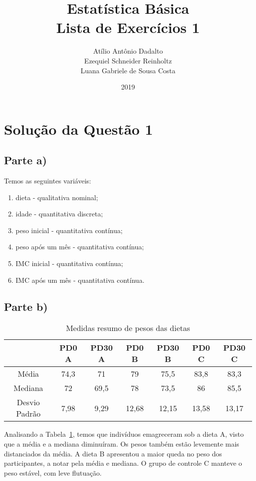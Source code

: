 \documentclass[
	12pt,				%
	openright,			%
	twoside,			%
	a4paper,			%
	english,			%
	french,				%
	spanish,			%
	brazil,				%
	]{abntex2}
\title{\blue Estatística Básica \\
\blueb Lista de Exercícios 1}
\author{Atílio Antônio Dadalto\\Ezequiel Schneider Reinholtz\\Luana Gabriele de Sousa Costa}
\date{2019}
\begin{document}
\frenchspacing

\textual


\maketitle
\textual
\newpage

\section{Solução da Questão 1}
\subsection{Parte a)}
Temos as seguintes variáveis:
\begin{enumerate}[label=\Alph*)]
    \item dieta - qualitativa nominal;
    \item idade - quantitativa discreta;
    \item peso inicial - quantitativa contínua;
    \item peso após um mês - quantitativa contínua;
    \item IMC inicial - quantitativa contínua;
    \item IMC após um mês - quantitativa contínua.
\end{enumerate}

\subsection{Parte b)}
\begin{table}[ht]
    \centering
    \renewcommand\arraystretch{1.5}
    \begin{tabular}{c c c c c c c}
        \hline & PD0 A & PD30 A & PD0 B & PD30 B & PD0 C & PD30 C \\
        \hline Média & 74,3 & 71 & 79 & 75,5 & 83,8 & 83,3 \\
        Mediana & 72 & 69,5 & 78 & 73,5 & 86 & 85,5 \\
        Desvio Padrão & 7,98 & 9,29 & 12,68 & 12,15 & 13,58 & 13,17 \\
        \hline
    \end{tabular}
    \caption{Medidas resumo de pesos das dietas}
    \label{medidas-pesos}
\end{table}

Analisando a Tabela~\ref{medidas-pesos}, temos que indivíduos emagreceram sob a dieta A, visto que a média e a mediana diminuíram. Os pesos também estão levemente mais distanciados da média. A dieta B apresentou a maior queda no peso dos participantes, a notar pela média e mediana. O grupo de controle C manteve o peso estável, com leve flutuação. 
\end{document}
